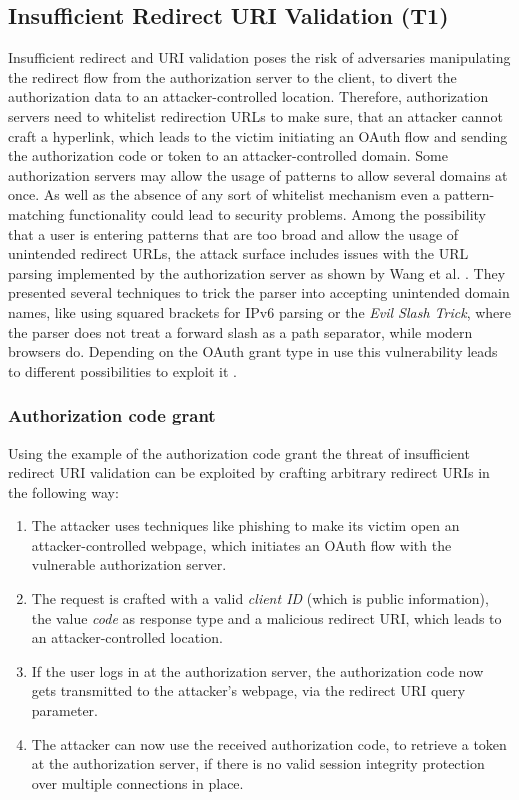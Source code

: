 \subsection[Insufficient Redirect URI Validation]{Insufficient Redirect URI Validation (T1)}
\label{threat:T1}
Insufficient redirect and URI validation poses the risk of adversaries manipulating the redirect flow from the authorization server to the client, to divert the authorization data to an attacker-controlled location. Therefore, authorization servers need to whitelist redirection URLs to make sure, that an attacker cannot craft a hyperlink, which leads to the victim initiating an OAuth flow and sending the authorization code or token to an attacker-controlled domain. Some authorization servers may allow the usage of patterns to allow several domains at once. As well as the absence of any sort of whitelist mechanism even a pattern-matching functionality could lead to security problems. Among the possibility that a user is entering
patterns that are too broad and allow the usage of unintended redirect URLs, the attack surface includes issues with the URL parsing implemented by the authorization server as shown by Wang et al. \cite{wang2019make}. They presented several techniques to trick the parser into accepting unintended domain names, like using squared brackets for IPv6 parsing or the \emph{Evil Slash Trick}, where the parser does not treat a forward slash as a path
separator, while modern browsers do. Depending on the OAuth grant type in use this vulnerability leads to different possibilities to exploit it \cite{lodderstedt2020oauth}.


\subsubsection{Authorization code grant}
Using the example of the authorization code grant the threat of insufficient redirect URI validation can be exploited by crafting arbitrary redirect URIs in the following way:

\begin{enumerate}
    \item The attacker uses techniques like phishing to make its victim open an attacker-controlled webpage, which initiates an OAuth flow with the vulnerable authorization server.
	
    \item The request is crafted with a valid \emph{client ID} (which is public information), the value \emph{code} as response type and a malicious redirect URI, which leads to an attacker-controlled location.
	
    \item If the user logs in at the authorization server, the authorization code now gets transmitted to the attacker's webpage, via the redirect URI query parameter.
	
    \item The attacker can now use the received authorization code, to retrieve a token at the authorization server, if there is no valid session integrity protection over multiple connections in place.
\end{enumerate}


